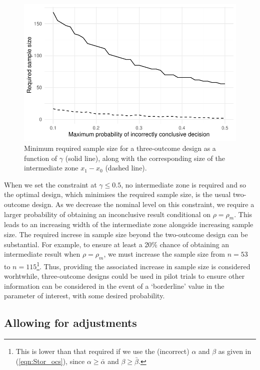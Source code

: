 \documentclass[sagev]{sagej} %
\begin{document}
\begin{figure}
\centering
\includegraphics[scale=0.8]{./figures/gamma_ns}
\caption{Minimum required sample size for a three-outcome design as a function of $\gamma$ (solid line), along with the corresponding size of the intermediate zone $x_1 - x_0$ (dashed line).}
\label{fig:gamma_ns}
\end{figure}

When we set the constraint at $\gamma \leq 0.5$, no intermediate zone is required and so the optimal design, which minimises the required sample size, is the usual two-outcome design. As we decrease the nominal level on this constraint, we require a larger probability of obtaining an inconclusive result conditional on $\rho = \rho_m$. This leads to an increasing width of the intermediate zone alongside increasing sample size. The required increse in sample size beyond the two-outcome design can be substantial. For example, to ensure at least a 20\% chance of obtaining an intermediate result when $\rho = \rho_m$, we must increase the sample size from $n = 53$ to $n = 115$\footnote{This is lower than that required if we use the (incorrect) $\alpha$ and $\beta$ as given in (\ref{eqn:Stor_ocs}), since $\alpha \geq \bar{\alpha}$ and $\beta \geq \bar{\beta}$.}. Thus, providing the associated increase in sample size is considered worhtwhile, three-outcome designs could be used in pilot trials to ensure other information can be considered in the event of a `borderline' value in the parameter of interest, with some desired probability.

\subsection{Allowing for adjustments}
\end{document}
